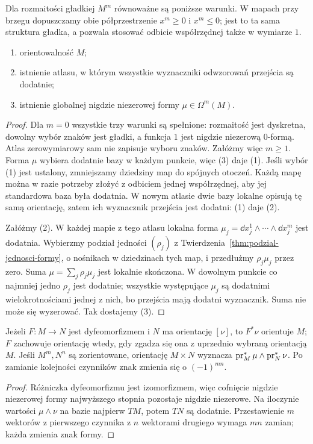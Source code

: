 \begin{twierdzenie}
\label{thm:orientacja-atlas-forma}
Dla rozmaitości gładkiej $M^m$ równoważne są
poniższe warunki. W mapach przy brzegu dopuszczamy
obie półprzestrzenie $x^m\geq0$ i $x^m\leq0$;
jest to ta sama struktura gładka, a pozwala stosować
odbicie współrzędnej także w wymiarze $1$.
\begin{enumerate}[leftmargin=*]
\item orientowalność $M$;
\item istnienie atlasu, w którym wszystkie wyznaczniki
      odwzorowań przejścia są dodatnie;
\item istnienie globalnej nigdzie niezerowej formy
      $\mu\in\Omega^m(M)$.
\end{enumerate}
\end{twierdzenie}
\begin{proof}
Dla $m=0$ wszystkie trzy warunki są spełnione:
rozmaitość jest dyskretna, dowolny wybór znaków jest
gładki, a funkcja $1$ jest nigdzie niezerową $0$-formą.
Atlas zerowymiarowy sam nie zapisuje wyboru znaków.
Załóżmy więc $m\geq1$.
Forma $\mu$ wybiera dodatnie bazy w każdym punkcie,
więc (3) daje (1). Jeśli wybór (1) jest ustalony,
zmniejszamy dziedziny map do spójnych otoczeń.
Każdą mapę można w razie potrzeby złożyć z odbiciem
jednej współrzędnej, aby jej standardowa baza była
dodatnia. W nowym atlasie dwie bazy lokalne opisują
tę samą orientację, zatem ich wyznacznik przejścia
jest dodatni: (1) daje (2).

Załóżmy (2). W każdej mapie z tego atlasu lokalna
forma $\mu_j=\dd x_j^1\wedge\cdots\wedge\dd x_j^m$
jest dodatnia. Wybierzmy podział jedności $(\rho_j)$
z Twierdzenia~\ref{thm:podzial-jednosci-formy},
o nośnikach w dziedzinach tych map, i przedłużmy
$\rho_j\mu_j$ przez zero. Suma
$\mu=\sum_j\rho_j\mu_j$ jest lokalnie skończona.
W dowolnym punkcie co najmniej jedno $\rho_j$ jest
dodatnie; wszystkie występujące $\mu_j$ są dodatnimi
wielokrotnościami jednej z nich, bo przejścia
mają dodatni wyznacznik. Suma nie może się
wyzerować. Tak dostajemy (3).
\end{proof}

\begin{stwierdzenie}
\label{prop:orientacja-iloczyn-pullback}
Jeżeli $F:M\to N$ jest dyfeomorfizmem i $N$ ma
orientację $[\nu]$, to $F^*\nu$ orientuje $M$;
$F$ zachowuje orientację wtedy, gdy zgadza się ona
z uprzednio wybraną orientacją $M$. Jeśli $M^m,N^n$
są zorientowane, orientację $M\times N$ wyznacza
$\operatorname{pr}_M^*\mu\wedge\operatorname{pr}_N^*\nu$.
Po zamianie kolejności czynników znak zmienia się
o $(-1)^{mn}$.
\end{stwierdzenie}
\begin{proof}
Różniczka dyfeomorfizmu jest izomorfizmem, więc
cofnięcie nigdzie niezerowej formy najwyższego stopnia
pozostaje nigdzie niezerowe. Na iloczynie wartości
$\mu\wedge\nu$ na bazie najpierw $TM$, potem $TN$
są dodatnie. Przestawienie $m$ wektorów z pierwszego
czynnika z $n$ wektorami drugiego wymaga $mn$
zamian; każda zmienia znak formy.
\end{proof}

